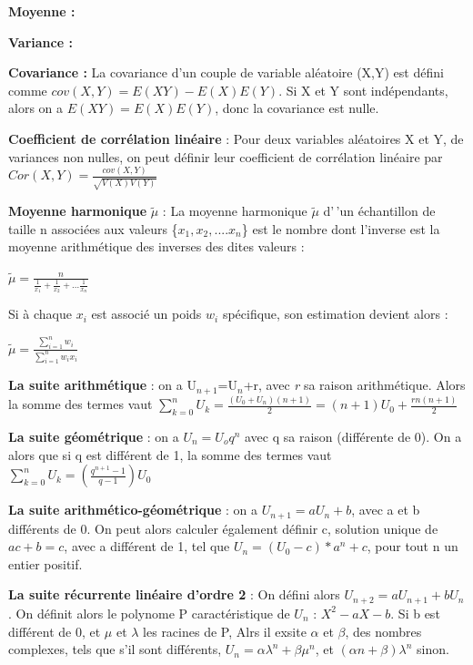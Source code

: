 \documentclass[
]{article}
\begin{document}
\textbf{Moyenne :}

\textbf{Variance :}

\textbf{Covariance :} La covariance d'un couple de variable aléatoire
(X,Y) est défini comme \(cov(X,Y)=E(XY)-E(X)E(Y)\). Si X et Y sont
indépendants, alors on a \(E(XY)=E(X)E(Y)\), donc la covariance est
nulle.

\textbf{Coefficient de corrélation linéaire} : Pour deux variables
aléatoires X et Y, de variances non nulles, on peut définir leur
coefficient de corrélation linéaire par
\(Cor(X,Y)=\frac{cov(X,Y)}{\sqrt{V(X)V(Y)}}\)

\textbf{Moyenne harmonique} \(\tilde{\mu}\) : La moyenne harmonique
\(\tilde{\mu}\) d'\,'un échantillon de taille n associées aux valeurs
\{\(x_1,x_2,....x_n\)\} est le nombre dont l'inverse est la moyenne
arithmétique des inverses des dites valeurs :

\begin{center}
  $\tilde{\mu}=\frac{n}{\frac{1}{x_1}+\frac{1}{x_2}+...\frac{1}{x_n}}$
\end{center}

Si à chaque \(x_i\) est associé un poids \(w_i\) spécifique, son
estimation devient alors :

\begin{center}
  $\tilde{\mu}=\frac{\sum_{i=1}^nw_i}{\sum_{i=1}^nw_ix_i}$
\end{center}

\textbf{La suite arithmétique} : on a U\(_{n+1}\)=U\(_n\)+r, avec
\emph{r} sa raison arithmétique. Alors la somme des termes vaut
\(\sum_{k=0}^nU_k=\frac{(U_0+U_n)(n+1)}{2}=(n+1)U_0+\frac{rn(n+1)}{2}\)

\textbf{La suite géométrique} : on a \(U_n=U_oq^n\) avec q sa raison
(différente de 0). On a alors que si q est différent de 1, la somme des
termes vaut \(\sum_{k=0}^nU_k=(\frac{q^{n+1}-1}{q-1})U_0\)

\textbf{La suite arithmético-géométrique} : on a \(U_{n+1}=aU_n+b\),
avec a et b différents de 0. On peut alors calculer également définir c,
solution unique de \(ac+b=c\), avec a différent de 1, tel que
\(U_n=(U_0-c)*a^n+c\), pour tout n un entier positif.

\textbf{La suite récurrente linéaire d'ordre 2} : On défini alors
\(U_{n+2}=aU_{n+1}+bU_n\). On définit alors le polynome P
caractéristique de \(U_n\) : \(X^2-aX-b\). Si b est différent de 0, et
\(\mu\) et \(\lambda\) les racines de P, Alrs il exsite \(\alpha\) et
\(\beta\), des nombres complexes, tels que s'il sont différents,
\(U_n=\alpha \lambda^n + \beta \mu ^n\), et
\((\alpha n+ \beta) \lambda ^n\) sinon.
\end{document}
